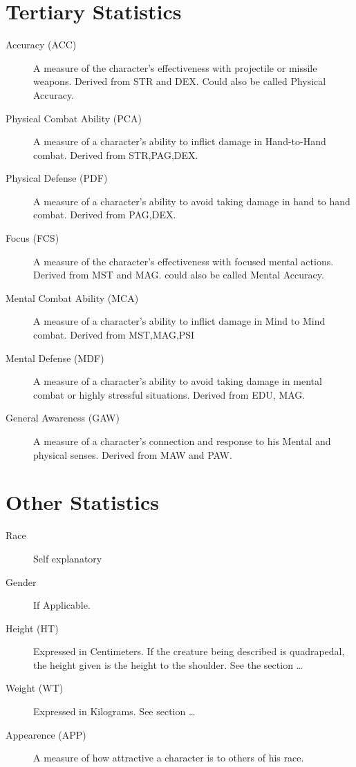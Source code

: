 \section{Tertiary Statistics}
\begin{description}
	\item[Accuracy (ACC)]
    A measure of the character's effectiveness with projectile or missile
    weapons. Derived from STR and DEX. Could also be called Physical
    Accuracy.
	\item[Physical Combat Ability (PCA)]
    A measure of a character's ability to in\-flict 
	dam\-age in Hand-to-Hand combat. Derived from STR,PAG,DEX.
	\item[Physical Defense (PDF)]
    A measure of a character's ability to avoid taking damage in hand to
    hand combat. Derived from PAG,DEX.
	\item[Focus	(FCS)]
    A measure of the character's effectiveness with focused mental
    actions. Derived from MST and MAG. could also be called Mental
    Accuracy.
	\item[Mental Combat Ability (MCA)]
    A measure of a character's ability to inflict damage in Mind to Mind
    combat. Derived from MST,MAG,PSI
	\item[Mental Defense (MDF)]
    A measure of a character's ability to avoid taking damage in mental
    combat or highly stressful situations. Derived from EDU, MAG.
	\item[General Awareness (GAW)]
    A measure of a character's connection and response to his Mental and
    physical senses. Derived from MAW and PAW.
\end{description}

\section{Other Statistics}
\begin{description}
	\item[Race]
    Self explanatory
	\item[Gender]
    If Applicable.
	\item[Height  (HT) ]
    Expressed in Centimeters. If the creature being described is
    quadrapedal, the height given is the height to the shoulder.
    See the section \dots
	\item[Weight  (WT) ]
    Expressed in Kilograms. See section \dots
	\item[Appearence   (APP)]
    A measure of how attractive a character is to others of his race.
\end{description}

